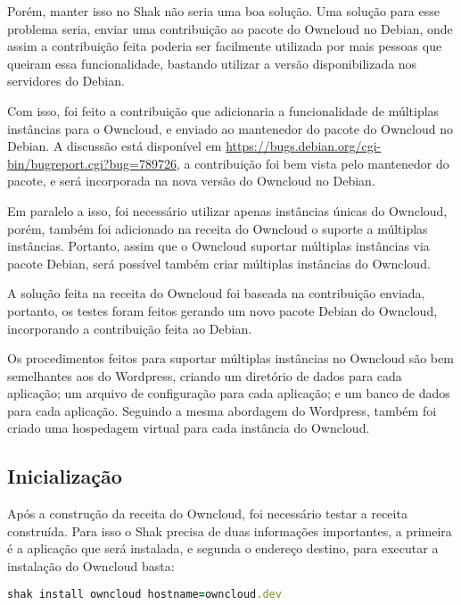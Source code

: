 Porém, manter isso no Shak não seria uma boa solução. Uma solução para esse problema seria, 
enviar uma contribuição ao pacote do Owncloud no Debian, onde assim a contribuição feita
poderia ser facilmente utilizada por mais pessoas que queiram essa funcionalidade,
bastando utilizar a versão disponibilizada nos servidores do Debian. 

Com isso, foi feito a contribuição que adicionaria a funcionalidade de múltiplas 
instâncias para o Owncloud, e enviado ao mantenedor do pacote do Owncloud no Debian. 
A discussão está disponível em \url{https://bugs.debian.org/cgi-bin/bugreport.cgi?bug=789726},
a contribuição foi bem vista pelo mantenedor do pacote, e será incorporada na nova
versão do Owncloud no Debian.

Em paralelo a isso,
foi necessário utilizar apenas instâncias únicas do Owncloud, porém, também foi
adicionado na receita do Owncloud o suporte a múltiplas instâncias. Portanto, 
assim que o Owncloud suportar múltiplas instâncias via pacote Debian, será possível
também criar múltiplas instâncias do Owncloud.

A solução feita na receita do Owncloud foi baseada na contribuição enviada, portanto,
os testes foram feitos gerando um novo pacote Debian do Owncloud, incorporando
a contribuição feita ao Debian. 

Os procedimentos feitos para suportar múltiplas instâncias
no Owncloud são bem semelhantes aos do Wordpress, criando um diretório de dados
para cada aplicação; um arquivo de configuração para cada aplicação; e um banco de
dados para cada aplicação. Seguindo a mesma abordagem do Wordpress, também
foi criado uma hospedagem virtual para cada instância do Owncloud.

\subsection{Inicialização}

Após a construção da receita do Owncloud, foi necessário testar a receita construída. 
Para isso o Shak precisa de duas informações importantes, a primeira é a aplicação
que será instalada, e segunda o endereço destino, para executar a instalação
do Owncloud basta:

\begin{lstlisting}[language=Ruby,label=dice_index,caption={Exemplo de execução de instalação do Owncloud com shak}]
shak install owncloud hostname=owncloud.dev
\end{lstlisting}

